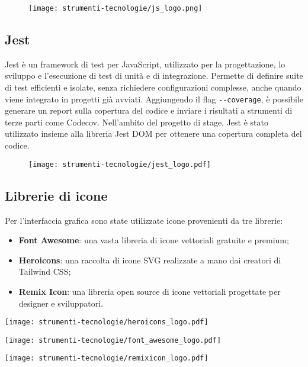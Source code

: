 \begin{figure}[H]
    \centering 
    \texttt{[image: strumenti-tecnologie/js\_logo.png]} 
\end{figure}

\subsection*{Jest}

\par Jest è un framework di test per JavaScript, utilizzato per la progettazione, lo sviluppo e l’esecuzione di test di unità e di integrazione. Permette di definire suite di test efficienti e isolate, senza richiedere configurazioni complesse, anche quando viene integrato in progetti già avviati. Aggiungendo il flag \verb|--coverage|, è possibile generare un report sulla copertura del codice e inviare i risultati a strumenti di terze parti come Codecov. Nell’ambito del progetto di stage, Jest è stato utilizzato insieme alla libreria Jest DOM per ottenere una copertura completa del codice.

\begin{figure}[H]
    \centering 
    \texttt{[image: strumenti-tecnologie/jest\_logo.pdf]} 
\end{figure}

\subsection*{Librerie di icone}

\par Per l’interfaccia grafica sono state utilizzate icone provenienti da tre librerie:
\begin{itemize}
  \item \textbf{Font Awesome}: una vasta libreria di icone vettoriali gratuite e premium;
  \item \textbf{Heroicons}: una raccolta di icone SVG realizzate a mano dai creatori di Tailwind CSS;
  \item \textbf{Remix Icon}: una libreria open source di icone vettoriali progettate per designer e sviluppatori.
\end{itemize}

\vspace{5pt}
\begin{center}
  \begin{minipage}{0.3\columnwidth}
    \centering
    \texttt{[image: strumenti-tecnologie/heroicons\_logo.pdf]} 
  \end{minipage}
  \hfill
  \begin{minipage}{0.3\columnwidth}
    \centering
    \texttt{[image: strumenti-tecnologie/font\_awesome\_logo.pdf]} 
  \end{minipage}
  \hfill
  \begin{minipage}{0.3\columnwidth}
    \centering
    \texttt{[image: strumenti-tecnologie/remixicon\_logo.pdf]} 
  \end{minipage}
\end{center}


